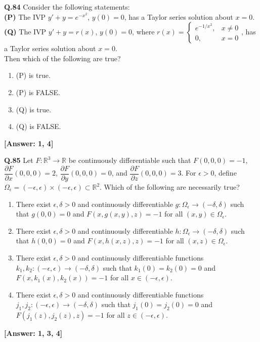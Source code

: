 \documentclass[12pt,a4paper]{article}
\newcommand{\ans}[1]{\quad\textcolor{anscolor}{\textbf{[Answer: #1]}}}
\begin{document}
\textbf{Q.84} Consider the following statements:\\
\textbf{(P)} The IVP $y'+y=e^{-x^2}$, $y(0)=0$, has a Taylor series solution about $x=0$.\\
\textbf{(Q)} The IVP $y'+y=r(x)$, $y(0)=0$, where $r(x)=\begin{cases}e^{-1/x^2},&x\neq0\\0,&x=0\end{cases}$, has a Taylor series solution about $x=0$.\\
Then which of the following are true?
\begin{enumerate}[label=\arabic*.]
\item (P) is true. \item (P) is FALSE.
\item (Q) is true. \item (Q) is FALSE.
\end{enumerate}\ans{1, 4}

\textbf{Q.85} Let $F:\mathbb{R}^3\to\mathbb{R}$ be continuously differentiable such that $F(0,0,0)=-1$, $\dfrac{\partial F}{\partial x}(0,0,0)=2$, $\dfrac{\partial F}{\partial y}(0,0,0)=0$, and $\dfrac{\partial F}{\partial z}(0,0,0)=3$. For $\epsilon>0$, define $\Omega_\epsilon=(-\epsilon,\epsilon)\times(-\epsilon,\epsilon)\subset\mathbb{R}^2$. Which of the following are necessarily true?
\begin{enumerate}[label=\arabic*.]
\item There exist $\epsilon,\delta>0$ and continuously differentiable $g:\Omega_\epsilon\to(-\delta,\delta)$ such that $g(0,0)=0$ and $F(x,g(x,y),z)=-1$ for all $(x,y)\in\Omega_\epsilon$.
\item There exist $\epsilon,\delta>0$ and continuously differentiable $h:\Omega_\epsilon\to(-\delta,\delta)$ such that $h(0,0)=0$ and $F(x,h(x,z),z)=-1$ for all $(x,z)\in\Omega_\epsilon$.
\item There exist $\epsilon,\delta>0$ and continuously differentiable functions $k_1,k_2:(-\epsilon,\epsilon)\to(-\delta,\delta)$ such that $k_1(0)=k_2(0)=0$ and $F(x,k_1(x),k_2(x))=-1$ for all $x\in(-\epsilon,\epsilon)$.
\item There exist $\epsilon,\delta>0$ and continuously differentiable functions $j_1,j_2:(-\epsilon,\epsilon)\to(-\delta,\delta)$ such that $j_1(0)=j_2(0)=0$ and $F(j_1(z),j_2(z),z)=-1$ for all $z\in(-\epsilon,\epsilon)$.
\end{enumerate}\ans{1, 3, 4}
\end{document}
